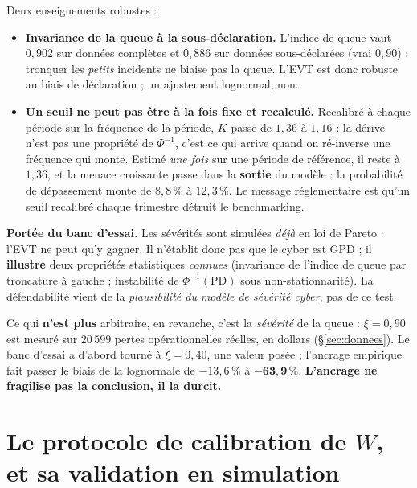 \documentclass[11pt,a4paper]{article}
\begin{document}
\noindent Deux enseignements robustes :
\begin{itemize}[leftmargin=1.4em,itemsep=1pt]
\item \textbf{Invariance de la queue à la sous-déclaration.} L'indice de queue vaut $0{,}902$
  sur données complètes et $0{,}886$ sur données sous-déclarées (vrai $0{,}90$) : tronquer les
  \emph{petits} incidents ne biaise pas la queue. L'EVT est donc robuste au biais de
  déclaration ; un ajustement lognormal, non.
\item \textbf{Un seuil ne peut pas être à la fois fixe et recalculé.} Recalibré à chaque
  période sur la fréquence de la période, $K$ passe de $1{,}36$ à $1{,}16$ : la dérive n'est
  pas une propriété de $\Phi^{-1}$, c'est ce qui arrive quand on ré-inverse une fréquence qui
  monte. Estimé \emph{une fois} sur une période de référence, il reste à $1{,}36$, et la
  menace croissante passe dans la \textbf{sortie} du modèle : la probabilité de dépassement
  monte de $8{,}8\,\%$ à $12{,}3\,\%$. Le message réglementaire est qu'un seuil recalibré
  chaque trimestre détruit le benchmarking.
\end{itemize}

\begin{attention}
\textbf{Portée du banc d'essai.} Les sévérités sont simulées
\emph{déjà} en loi de Pareto : l'EVT ne peut qu'y gagner. Il n'établit donc pas que le
cyber est GPD ; il \textbf{illustre} deux propriétés statistiques \emph{connues} (invariance de
l'indice de queue par troncature à gauche ; instabilité de $\Phi^{-1}(\mathrm{PD})$ sous
non-stationnarité). La défendabilité vient de la \emph{plausibilité du modèle de sévérité
cyber}, pas de ce test.

\smallskip
\noindent Ce qui \textbf{n'est plus} arbitraire, en revanche, c'est la \emph{sévérité} de la
queue : $\xi = 0{,}90$ est mesuré sur $20\,599$ pertes opérationnelles réelles, en dollars
(\S\ref{sec:donnees}). Le banc d'essai a d'abord tourné à $\xi = 0{,}40$, une valeur posée ;
l'ancrage empirique fait passer le biais de la lognormale de $-13{,}6\,\%$ à
$\mathbf{-63{,}9\,\%}$. \textbf{L'ancrage ne fragilise pas la conclusion, il la durcit.}
\end{attention}

\section{Le protocole de calibration de $W$, et sa validation en simulation}
\label{sec:calib}
\end{document}
